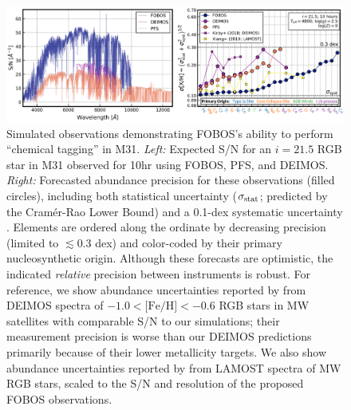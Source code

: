 \documentclass[11pt,a4paper,twoside,onecolumn,openany,final,oldfontcommands]{memoir}
\begin{document}
\begin{figure}
\includegraphics[width=1.0\textwidth]{figs/abundances_snr_v6.png}
\caption[Simulated M31 RGB spectra and abundance forecasts]{Simulated observations demonstrating FOBOS's ability to perform ``chemical tagging'' in M31. \textit{Left:} Expected S/N for an $i=21.5$ RGB star in M31 observed for 10hr using FOBOS, PFS, and DEIMOS. \textit{Right:}  Forecasted abundance precision for these observations (filled circles), including both statistical uncertainty ($\sigma_{\rm stat}$; predicted by the Cram\'er-Rao Lower Bound) and a 0.1-dex systematic uncertainty \citep[$\sigma_{\rm syst}$; cf.,][]{kirby18, xiang2019}. Elements are ordered along the ordinate by decreasing precision (limited to $\lesssim$0.3 dex) and color-coded by their primary nucleosynthetic origin. Although these forecasts are optimistic, the indicated \textit{relative} precision between instruments is robust. For reference, we show abundance uncertainties reported by \citet[][purple squares]{kirby18} from DEIMOS spectra of $-1.0<\text{[Fe/H]}<-0.6$ RGB stars in MW satellites with comparable S/N to our simulations; their measurement precision is worse than our DEIMOS predictions primarily because of their lower metallicity targets.  We also show abundance uncertainties reported by \citet[][yellow squares]{xiang2019} from LAMOST spectra of MW RGB stars, scaled to the S/N and resolution of the proposed FOBOS  observations.}
\label{fig:abundances_snr}
\end{figure}
\end{document}
